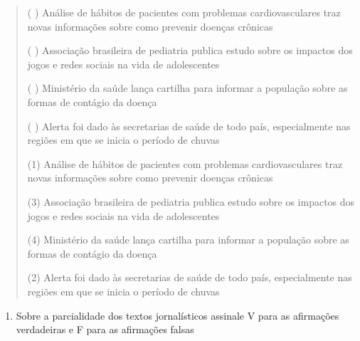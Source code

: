 \begin{quote}
( ) Análise de hábitos de pacientes com problemas cardiovasculares traz
novas informações sobre como prevenir doenças crônicas

( ) Associação brasileira de pediatria publica estudo sobre os impactos
dos jogos e redes sociais na vida de adolescentes

( ) Ministério da saúde lança cartilha para informar a população sobre
as formas de contágio da doença

( ) Alerta foi dado às secretarias de saúde de todo país, especialmente
nas regiões em que se inicia o período de chuvas

(1) Análise de hábitos de pacientes com problemas cardiovasculares traz
novas informações sobre como prevenir doenças crônicas

(3) Associação brasileira de pediatria publica estudo sobre os impactos
dos jogos e redes sociais na vida de adolescentes

(4) Ministério da saúde lança cartilha para informar a população sobre
as formas de contágio da doença

(2) Alerta foi dado às secretarias de saúde de todo país, especialmente
nas regiões em que se inicia o período de chuvas
\end{quote}

\begin{enumerate}
\def\labelenumi{\arabic{enumi})}
\setcounter{enumi}{5}
\tightlist
\item
  Sobre a parcialidade dos textos jornalísticos assinale V para as
  afirmações verdadeiras e F para as afirmações falsas
\end{enumerate}

